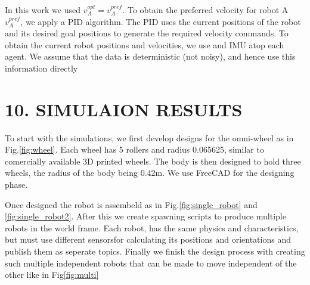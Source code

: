 \documentclass[12pt]{report}
\begin{document}
In this work we used $v^{opt}_{A} = v^{pref}_{A}$. To obtain the preferred velocity for robot A $v^{pref}_{A}$, we apply a PID algorithm. The PID uses the current positions of the robot and its desired goal positions to generate the required velocity commands. To obtain the current robot positions and velocities, we use and IMU atop each agent. We assume that the data is deterministic (not noisy), and hence use this information directly

\chapter*{10. SIMULAION RESULTS}

To start with the simulations, we first develop designs for the omni-wheel as in Fig.\ref{fig:wheel}. Each wheel has 5 rollers and radius 0.065625, similar to comercially available 3D printed wheels. The body is then designed to hold three wheels, the radius of the body being 0.42m. We use FreeCAD for the designing phase.

Once designed the robot is assembeld as in Fig.\ref{fig:single_robot} and \ref{fig:single_robot2}. After this we create spawning scripts to produce multiple robots in the world frame. Each robot, has the same physics and characteristics, but must use different sensorsfor calculating its positions and orientations and publish them as seperate topics. Finally we finish the design process with creating such multiple independent robots that can be made to move independent of the other like in Fig\ref{fig:multi}
\end{document}
